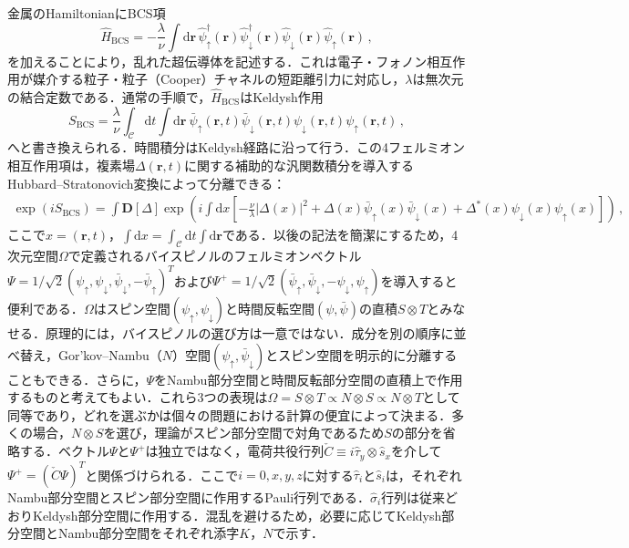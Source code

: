 \documentclass[a4paper,11pt]{ltjsarticle}
\def\d{\mathrm{d}}
\def\D{\mathbf{D}}
\def\rt{(\mathbf{r},t)}
\begin{document}
金属のHamiltonianにBCS項
$$\hat{H}_{\mathrm{BCS}}=-\frac{\lambda}{\nu}\int\d\mathbf{r}\,\hat{\psi}^{\dag}_{\uparrow}(\mathbf{r})
\hat{\psi}^{\dag}_{\downarrow}(\mathbf{r})
\hat{\psi}_{\downarrow}(\mathbf{r})
\hat{\psi}_{\uparrow}(\mathbf{r})\,,$$
を加えることにより，乱れた超伝導体を記述する．これは電子・フォノン相互作用が媒介する粒子・粒子（Cooper）チャネルの短距離引力に対応し，$\lambda$は無次元の結合定数である．通常の手順で，$\hat{H}_{\mathrm{BCS}}$はKeldysh作用
$$S_{\mathrm{BCS}}=\frac{\lambda}{\nu}\int_{\mathcal{C}}\d
t\int\d\mathbf{r}\ \bar{\psi}_{\uparrow}\rt
\bar{\psi}_{\downarrow}\rt\psi_{\downarrow}\rt\psi_{\uparrow}\rt\,,$$
へと書き換えられる．時間積分はKeldysh経路に沿って行う．この4フェルミオン相互作用項は，複素場$\Delta\rt$に関する補助的な汎関数積分を導入するHubbard--Stratonovich変換によって分離できる：
\begin{eqnarray}\label{SuperCond-BCS-HS}
\exp(iS_{\mathrm{BCS}})=\int\D[\Delta]\exp\left(i\int\d
x\left[-\frac{\nu}{\lambda}|\Delta(x)|^{2}+\Delta(x)
\bar{\psi}_{\uparrow}(x)\bar{\psi}_{\downarrow}(x)+
\Delta^{*}(x)\psi_{\downarrow}(x)\psi_{\uparrow}(x)\right]\right)\,,
\end{eqnarray}
ここで$x=\rt$，$\int\d x=\int_{\mathcal{C}}\d t\int\d\mathbf{r}$である．以後の記法を簡潔にするため，4次元空間$\Omega$で定義されるバイスピノルのフェルミオンベクトル$\Psi=1/\sqrt{2}(\psi_{\uparrow},\psi_{\downarrow},\bar{\psi}_{\downarrow},-\bar{\psi}_{\uparrow})^{T}$および$\Psi^{+}=1/\sqrt{2}(\bar{\psi}_{\uparrow},\bar{\psi}_{\downarrow},-\psi_{\downarrow},\psi_{\uparrow})$を導入すると便利である．$\Omega$はスピン空間$(\psi_{\uparrow},\psi_{\downarrow})$と時間反転空間$(\psi,\bar{\psi})$の直積$S\otimes T$とみなせる．原理的には，バイスピノルの選び方は一意ではない．成分を別の順序に並べ替え，Gor'kov--Nambu\cite{Gor'kov,Nambu}（$N$）空間$(\psi_{\uparrow},\bar{\psi}_{\downarrow})$とスピン空間を明示的に分離することもできる．さらに，$\Psi$をNambu部分空間と時間反転部分空間の直積上で作用するものと考えてもよい．これら3つの表現は$\Omega=S\otimes T\propto N\otimes S\propto N\otimes T$として同等であり，どれを選ぶかは個々の問題における計算の便宜によって決まる．多くの場合，$N\otimes S$を選び，理論がスピン部分空間で対角であるため$S$の部分を省略する．ベクトル$\Psi$と$\Psi^{+}$は独立ではなく，電荷共役行列$\check{C}\equiv i\hat{\tau}_{y}\otimes\hat{s}_{x}$を介して$\Psi^{+}=(\check{C}\Psi)^{T}$と関係づけられる．ここで$i=0,x,y,z$に対する$\hat{\tau}_{i}$と$\hat{s}_{i}$は，それぞれNambu部分空間とスピン部分空間に作用するPauli行列である．$\hat\sigma_i$行列は従来どおりKeldysh部分空間に作用する．混乱を避けるため，必要に応じてKeldysh部分空間とNambu部分空間をそれぞれ添字$K$，$N$で示す．
\end{document}
